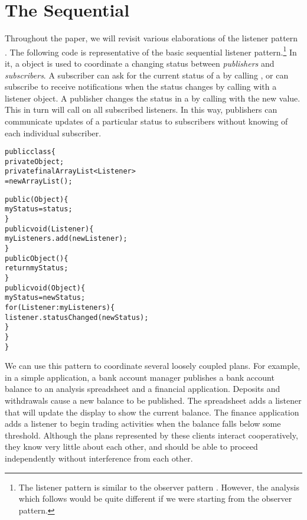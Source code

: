 \documentclass{llncs}
\begin{document}

\section{The Sequential }

Throughout the paper, we will revisit various elaborations of the
listener pattern \cite{Englander:beans}. The following code is
representative of the basic sequential listener pattern.\footnote{
%
The listener pattern \cite{Englander:beans} is similar to the observer
pattern \cite{gamma:patterns}. However, the analysis which follows
would be quite different if we were starting from the observer
pattern.}
%
In it, a  object is used to coordinate a changing
status between \emph{publishers} and \emph{subscribers}.  A subscriber
can ask for the current status of a  by calling
, or can subscribe to receive notifications when the
status changes by calling  with a listener object.
A publisher changes the status in a  by calling
 with the new value.  This in turn will call
 on all subscribed listeners.  In this way,
publishers can communicate updates of a particular status to
subscribers without knowing of each individual subscriber.
%
\begin{alltt}
    public class  \{
        private Object ;
        private final ArrayList<Listener>  
                          = new ArrayList();

        public (Object ) \{
            myStatus = status;
        \}
        public void (Listener ) \{
            myListeners.add(newListener);
        \}
        public Object () \{
            return myStatus; 
        \}
        public void (Object ) \{
            myStatus = newStatus;
            for (Listener : myListeners) \{
                listener.statusChanged(newStatus);
            \}
        \}
    \}
\end{alltt}
%
We can use this pattern to coordinate several loosely coupled
plans. For example, in a simple application, a bank account
manager publishes a bank account balance to an analysis spreadsheet
and a financial application.  Deposits and withdrawals cause a new
balance to be published.  The spreadsheet adds a listener that will
update the display to show the current balance. The finance
application adds a listener to begin trading activities when the
balance falls below some threshold.  Although the plans represented by
these clients interact cooperatively, they know very little about each
other, and should be able to proceed independently without
interference from each other.  
\end{document}
